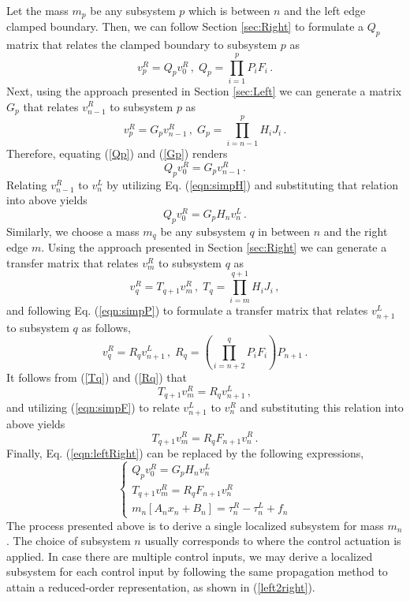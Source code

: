 \documentclass[11pt]{ucthesis}
\newcommand{\beq}{\begin{equation}}
\newcommand{\eeq}{\end{equation}}
\begin{document}
Let the mass $m_p$ be any subsystem $p$ which is between $n$ and the left edge clamped boundary. Then, we can follow Section \ref{sec:Right} to formulate a $Q_p$ matrix that relates the clamped boundary to subsystem $p$ as
\beq		\label{Qp}
v_p^R = Q_p v_0^R \,,\; Q_p = \prod_{i=1}^{p} P_i F_i \,.
\eeq
Next, using the approach presented in Section \ref{sec:Left} we can generate a matrix $G_p$ that relates $v_{n-1}^R$ to subsystem $p$ as 
\beq		\label{Gp}
v_{p}^R = G_{p} v_{n-1}^R \,,\;G_{p} = \prod_{i=n-1}^{p} H_i J_i\,.
\eeq
Therefore, equating (\ref{Qp}) and (\ref{Gp}) renders 
\[
Q_p v_0^R = G_{p} v_{n-1}^R\,.
\] 
Relating $v_{n-1}^R$ to $v_{n}^L$ by utilizing Eq. (\ref{eqn:simpH}) and substituting that relation into above yields
\beq		\label{QGp1}
Q_{p} v_0^R = G_{p} H_n v_{n}^L\,.
\eeq
Similarly, we choose a mass $m_q$ be any subsystem $q$ in between $n$ and the right edge $m$. Using the approach presented in Section \ref{sec:Right} we can generate a transfer matrix that relates $v_{m}^R$ to subsystem $q$ as   
\beq		\label{Tq}
v_{q}^R = T_{q+1} v_m^R \,,\; T_q = \prod_{i=m}^{q+1} H_i J_i \,,
\eeq
and following Eq. (\ref{eqn:simpP}) to formulate a transfer matrix that relates $v_{n+1}^{L}$ to subsystem $q$ as follows,
\beq		\label{Rq}
v_{q}^{R} = R_q v_{n+1}^{L} \,,\; R_q = \left ( \prod_{i=n+2}^{q} P_i F_i \right ) P_{n+1} \,.
\eeq
It follows from (\ref{Tq}) and (\ref{Rq}) that
\[
T_{q+1} v_m^R =  R_q v_{n+1}^{L} \,,
\]
and utilizing (\ref{eqn:simpF}) to relate $v_{n+1}^{L}$ to $v_n^R$ and substituting this relation into above yields
\beq		\label{RFq1}
T_{q+1} v_m^R =  R_q F_{n+1} v_{n}^{R} \,.
\eeq
Finally, Eq. (\ref{eqn:leftRight}) can be replaced by the following expressions,
\beq  \label{left2right}
\left \{ 
\begin{array}{l}
Q_{p} v_0^R = G_{p} H_n v_{n}^L \\
T_{q+1} v_m^R =  R_q F_{n+1} v_{n}^{R} \\
m_n \left [ A_n x_n+ B_n \right ] = \tau_n^R-\tau_n^L +f_n
\end{array}
\right .
\eeq
The process presented above is to derive a single localized subsystem for mass $m_n$. The choice of subsystem $n$ usually corresponds to where the control actuation is applied. In case there are multiple control inputs, we may derive a localized subsystem for each control input by following the same propagation method to attain a reduced-order representation, as shown in (\ref{left2right}).  
\end{document}
